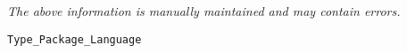 \label{pkg:type\_package\_language}

{\tiny \it The above information is manually maintained and may contain errors.}
\begin{verbatim}
Type_Package_Language
\end{verbatim}
